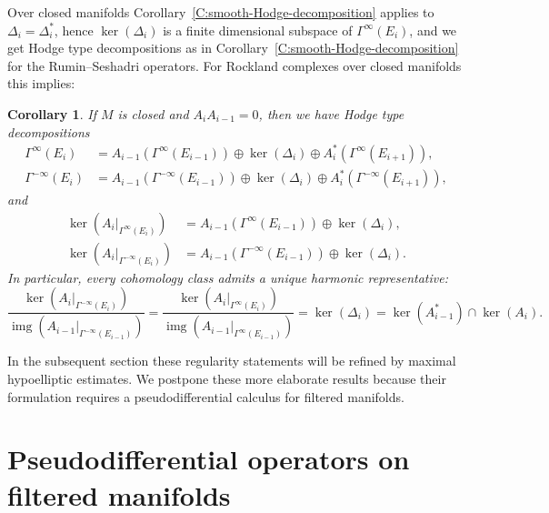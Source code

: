 \documentclass[reqno,12pt]{amsart}
\DeclareMathOperator{\img}{img}
\theoremstyle{plain}
\newtheorem{corollary}[theorem]{Corollary}
\theoremstyle{definition}
\begin{document}
Over closed manifolds Corollary~\ref{C:smooth-Hodge-decomposition} applies to $\Delta_i=\Delta_i^*$, hence $\ker(\Delta_i)$ is a finite dimensional subspace of $\Gamma^\infty(E_i)$, and we get Hodge type decompositions as in Corollary~\ref{C:smooth-Hodge-decomposition} for the Rumin--Seshadri operators.
For Rockland complexes over closed manifolds this implies:


\begin{corollary}\label{C:Hodge}
If $M$ is closed and $A_iA_{i-1}=0$, then we have Hodge type decompositions
\begin{align*}
\Gamma^\infty(E_i)&=A_{i-1}(\Gamma^\infty(E_{i-1}))\oplus\ker(\Delta_i)\oplus A_i^*(\Gamma^\infty(E_{i+1})),
\\
\Gamma^{-\infty}(E_i)&=A_{i-1}(\Gamma^{-\infty}(E_{i-1}))\oplus\ker(\Delta_i)\oplus A_i^*(\Gamma^{-\infty}(E_{i+1})),
\end{align*}
and
\begin{align*}
\ker(A_i|_{\Gamma^\infty(E_i)})&=A_{i-1}(\Gamma^\infty(E_{i-1}))\oplus\ker(\Delta_i),
\\
\ker(A_i|_{\Gamma^{-\infty}(E_i)})&=A_{i-1}(\Gamma^{-\infty}(E_{i-1}))\oplus\ker(\Delta_i).
\end{align*}
In particular, every cohomology class admits a unique harmonic representative:
$$
\frac{\ker(A_i|_{\Gamma^{-\infty}(E_i)})}{\img(A_{i-1}|_{\Gamma^{-\infty}(E_{i-1})})}
=\frac{\ker(A_i|_{\Gamma^\infty(E_i)})}{\img(A_{i-1}|_{\Gamma^\infty(E_{i-1})})}
=\ker(\Delta_i)
=\ker(A_{i-1}^*)\cap\ker(A_i).
$$
\end{corollary}


In the subsequent section these regularity statements will be refined by maximal hypoelliptic estimates.
We postpone these more elaborate results because their formulation requires a pseudodifferential calculus for filtered manifolds.








\section{Pseudodifferential operators on filtered manifolds}\label{S:PDO}
\end{document}
